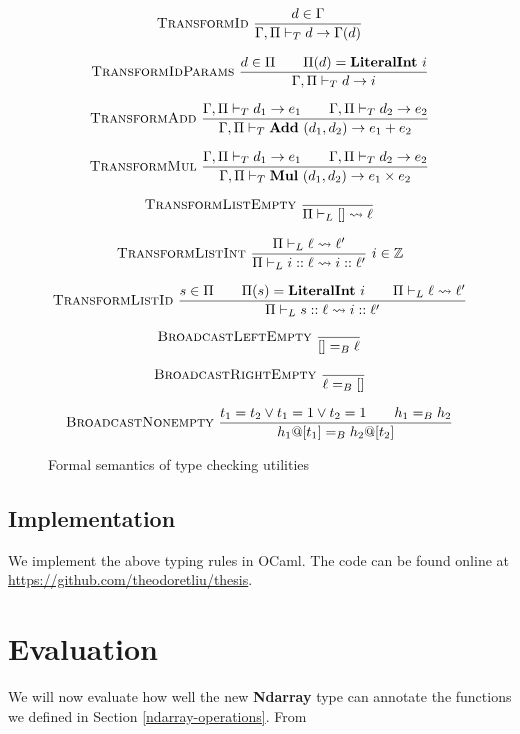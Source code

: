 \documentclass{report}
\begin{document}
\begin{figure}
    $$\textsc{TransformId}~\frac{d \in \Gamma}{\Gamma, \Pi \vdash_T d \rightarrow \Gamma(d)}$$

    $$\textsc{TransformIdParams}~\frac{d \in \Pi \qquad \Pi(d) = \textbf{LiteralInt}~i}{\Gamma, \Pi \vdash_T d \rightarrow i}$$

    $$\textsc{TransformAdd}~\frac{\Gamma, \Pi \vdash_T d_1 \rightarrow e_1 \qquad \Gamma, \Pi \vdash_T d_2 \rightarrow e_2}{\Gamma , \Pi \vdash_T \textbf{Add}~(d_1, d_2) \rightarrow e_1 + e_2}$$

    $$\textsc{TransformMul}~\frac{\Gamma, \Pi \vdash_T d_1 \rightarrow e_1 \qquad \Gamma, \Pi \vdash_T d_2 \rightarrow e_2}{\Gamma, \Pi \vdash_T \textbf{Mul}~(d_1, d_2) \rightarrow e_1 \times e_2}$$

    $$\textsc{TransformListEmpty}~\frac{}{\Pi \vdash_L [] \rightsquigarrow \ell}$$

    $$\textsc{TransformListInt}~\frac{\Pi \vdash_L \ell \rightsquigarrow \ell'}{\Pi \vdash_L i :: \ell \rightsquigarrow i :: \ell'}~i \in \mathbb Z$$

    $$\textsc{TransformListId}~\frac{s \in \Pi \qquad \Pi(s) = \textbf{LiteralInt}~i \qquad \Pi \vdash_L \ell \rightsquigarrow \ell'}{\Pi \vdash_L s :: \ell \rightsquigarrow i :: \ell'}$$

    $$\textsc{BroadcastLeftEmpty}~\frac{}{[] =_B \ell}$$

    $$\textsc{BroadcastRightEmpty}~\frac{}{\ell =_B []}$$

    $$\textsc{BroadcastNonempty}~\frac{t_1 = t_2 \lor t_1 = 1 \lor t_2 = 1 \qquad h_1 =_B h_2}{h_1 @ [t_1] =_B h_2 @ [t_2]}$$

    \caption{Formal semantics of type checking utilities}
    \label{semantics:utils}
\end{figure}

\section{Implementation}

We implement the above typing rules in OCaml. The code can be found online at \url{https://github.com/theodoretliu/thesis}.

\chapter{Evaluation}

We will now evaluate how well the new \textbf{Ndarray} type can annotate the functions we defined in Section \ref{ndarray-operations}. From
\end{document}
